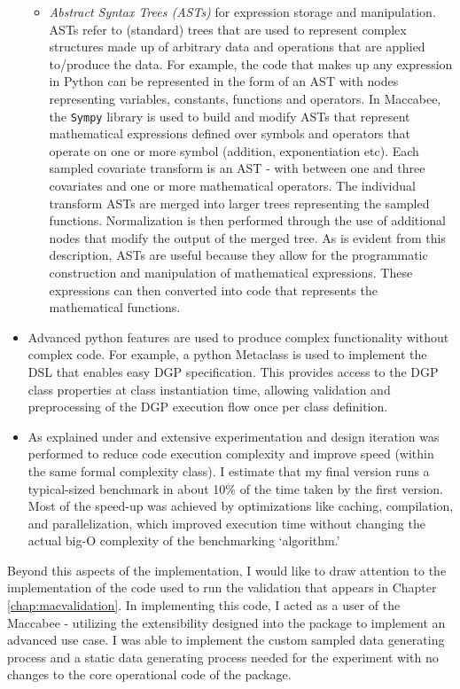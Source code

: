\documentclass[../main.tex]{subfiles}
\begin{document}
\begin{itemize}
\begin{itemize}
        \item \textit{Abstract Syntax Trees (ASTs)} for expression storage and manipulation. ASTs refer to (standard) trees that are used to represent complex structures made up of arbitrary data and operations that are applied to/produce the data. For example, the code that makes up any expression in Python can be represented in the form of an AST with nodes representing variables, constants, functions and operators. In Maccabee, the \texttt{Sympy} library is used to build and modify ASTs that represent mathematical expressions defined over symbols and operators that operate on one or more symbol (addition, exponentiation etc). Each sampled covariate transform is an AST - with between one and three covariates and one or more mathematical operators. The individual transform ASTs are merged into larger trees representing the sampled functions. Normalization is then performed through the use of additional nodes that modify the output of the merged tree. As is evident from this description, ASTs are useful because they allow for the programmatic construction and manipulation of mathematical expressions. These expressions can then converted into code that represents the mathematical functions.
    \end{itemize}
    
    \item Advanced python features are used to produce complex functionality without complex code. For example, a python Metaclass is used to implement the DSL that enables easy DGP specification. This provides access to the DGP class properties at class instantiation time, allowing validation and preprocessing of the DGP execution flow once per class definition.
    
    \item As explained under  and  extensive experimentation and design iteration was performed to reduce code execution complexity and improve speed (within the same formal complexity class). I estimate that my final version runs a typical-sized benchmark in about 10\% of the time taken by the first version. Most of the speed-up was achieved by optimizations like caching, compilation, and parallelization, which improved execution time without changing the actual big-O complexity of the benchmarking `algorithm.'
\end{itemize}

Beyond this aspects of the implementation, I would like to draw attention to the implementation of the code used to run the validation that appears in Chapter \ref{chap:macvalidation}. In implementing this code, I acted as a user of the Maccabee - utilizing the extensibility designed into the package to implement an advanced use case. I was able to implement the custom sampled data generating process and a static data generating process needed for the experiment with no changes to the core operational code of the package.
\end{document}

